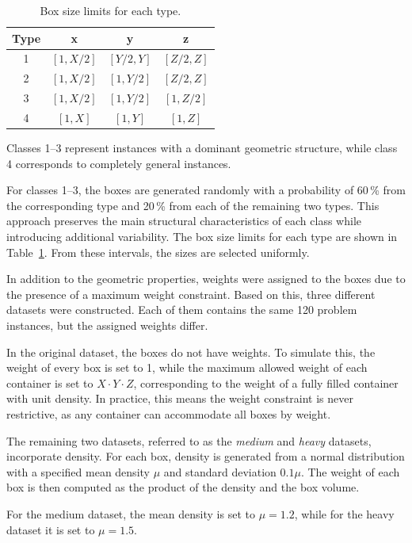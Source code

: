 \begin{table}[htbp]
\centering
\begin{tabular}{|c|c|c|c|}
\hline
\textbf{Type} & \textbf{x} & \textbf{y} & \textbf{z} \\
\hline
1 & $[1, X/2]$ & $[Y/2, Y]$ & $[Z/2, Z]$ \\
2 & $[1, X/2]$ & $[1, Y/2]$ & $[Z/2, Z]$ \\
3 & $[1, X/2]$ & $[1, Y/2]$ & $[1, Z/2]$ \\
4 & $[1, X]$ & $[1, Y]$ & $[1, Z]$ \\
\hline
\end{tabular}
\caption{Box size limits for each type.}
\label{tab:box_types}
\end{table}

Classes 1–3 represent instances with a dominant geometric structure, while class 4 corresponds to completely general instances. 

For classes 1–3, the boxes are generated randomly with a probability of 60\,\% from the corresponding type and 20\,\% from each of the remaining two types. This approach preserves the main structural characteristics of each class while introducing additional variability.
The box size limits for each type are shown in Table~\ref{tab:box_types}. From these intervals, the sizes are selected uniformly.

In addition to the geometric properties, weights were assigned to the boxes due to the presence of a maximum weight constraint. Based on this, three different datasets were constructed. Each of them contains the same 120 problem instances, but the assigned weights differ.

In the original dataset, the boxes do not have weights. To simulate this, the weight of every box is set to 1, while 
the maximum allowed weight of each container is set to $X \cdot Y \cdot Z$, corresponding to the weight of a fully filled container with unit density. In practice, this means the weight constraint is never restrictive, as any container can accommodate all boxes by weight.

The remaining two datasets, referred to as the \emph{medium} and \emph{heavy} datasets, incorporate density. For each box, density is generated from a normal distribution with a specified mean density $\mu$ and standard deviation $0.1\mu$. The weight of each box is then computed as the product of the density and the box volume.

For the medium dataset, the mean density is set to $\mu = 1.2$, while for the heavy dataset it is set to $\mu = 1.5$.



